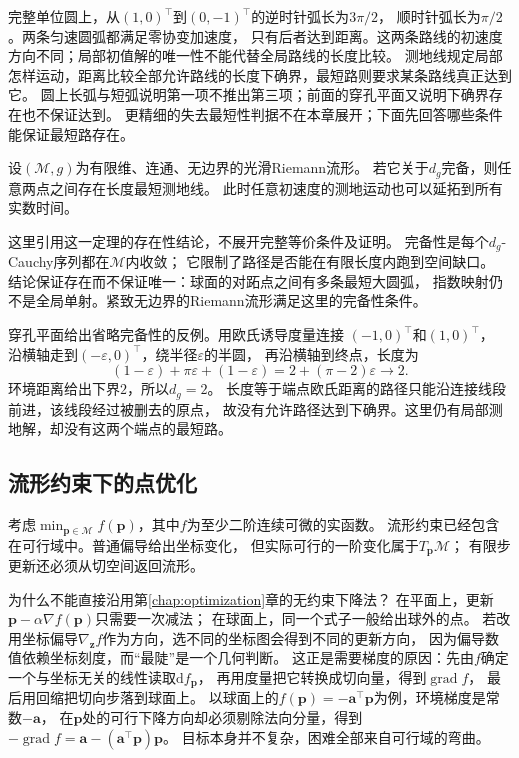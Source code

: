 完整单位圆上，从$(1,0)^\top$到$(0,-1)^\top$的逆时针弧长为$3\pi/2$，
顺时针弧长为$\pi/2$。两条匀速圆弧都满足零协变加速度，
只有后者达到距离。这两条路线的初速度方向不同；局部初值解的唯一性不能代替全局路线的长度比较。
测地线规定局部怎样运动，距离比较全部允许路线的长度下确界，最短路则要求某条路线真正达到它。
圆上长弧与短弧说明第一项不推出第三项；前面的穿孔平面又说明下确界存在也不保证达到。
更精细的失去最短性判据不在本章展开；下面先回答哪些条件能保证最短路存在。

\begin{theorem}
\label{thm:geometry-hopf-rinow-existence}
设$(\mathcal M,g)$为有限维、连通、无边界的光滑Riemann流形。
若它关于$d_g$完备，则任意两点之间存在长度最短测地线。
此时任意初速度的测地运动也可以延拓到所有实数时间。
\end{theorem}
这里引用这一定理的存在性结论，不展开完整等价条件及证明。
完备性是每个$d_g$-Cauchy序列都在$\mathcal M$内收敛；
它限制了路径是否能在有限长度内跑到空间缺口。
结论保证存在而不保证唯一：球面的对跖点之间有多条最短大圆弧，
指数映射仍不是全局单射。紧致无边界的Riemann流形满足这里的完备性条件。

穿孔平面给出省略完备性的反例。用欧氏诱导度量连接
$(-1,0)^\top$和$(1,0)^\top$，
沿横轴走到$(-\varepsilon,0)^\top$，绕半径$\varepsilon$的半圆，
再沿横轴到终点，长度为
\[
 (1-\varepsilon)+\pi\varepsilon+(1-\varepsilon)
 =2+(\pi-2)\varepsilon\longrightarrow2.
\]
环境距离给出下界$2$，所以$d_g=2$。
长度等于端点欧氏距离的路径只能沿连接线段前进，该线段经过被删去的原点，
故没有允许路径达到下确界。这里仍有局部测地解，却没有这两个端点的最短路。

\subsection{流形约束下的点优化}
\label{sec:geometry-point-optimization}
\label{sec:geometry-manifold-optimization}
\label{sec:geometry-point-optimality}

考虑$\min_{\bm p\in\mathcal M}f(\bm p)$，其中$f$为至少二阶连续可微的实函数。
流形约束已经包含在可行域中。普通偏导给出坐标变化，
但实际可行的一阶变化属于$T_{\bm p}\mathcal M$；
有限步更新还必须从切空间返回流形。

为什么不能直接沿用第\ref{chap:optimization}章的无约束下降法？
在平面上，更新$\bm p-\alpha\nabla f(\bm p)$只需要一次减法；
在球面上，同一个式子一般给出球外的点。
若改用坐标偏导$\nabla_{\bm z}f$作为方向，选不同的坐标图会得到不同的更新方向，
因为偏导数值依赖坐标刻度，而“最陡”是一个几何判断。
这正是需要梯度的原因：先由$f$确定一个与坐标无关的线性读取$\mathrm df_{\bm p}$，
再用度量把它转换成切向量，得到$\operatorname{grad}f$，
最后用回缩把切向步落到球面上。
以球面上的$f(\bm p)=-\bm a^\top\bm p$为例，环境梯度是常数$-\bm a$，
在$\bm p$处的可行下降方向却必须剔除法向分量，得到
$-\operatorname{grad}f=\bm a-(\bm a^\top\bm p)\bm p$。
目标本身并不复杂，困难全部来自可行域的弯曲。


